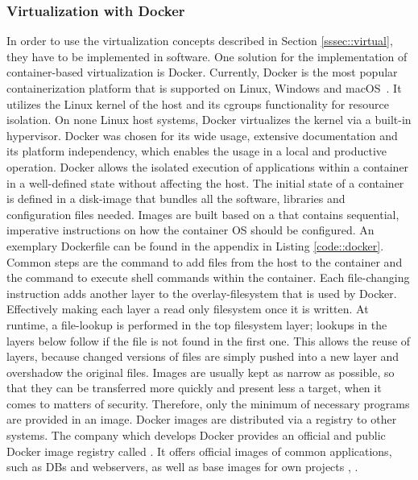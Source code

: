         \subsubsection{Virtualization with Docker}\label{sssec::docker}
        In order to use the virtualization concepts described in Section \ref{sssec::virtual}, they have to be implemented in software. One solution for the implementation of container-based virtualization is Docker. Currently, Docker is the most popular containerization platform that is supported on Linux, Windows and macOS~\cite{docker_share}. It utilizes the Linux kernel of the host and its cgroups functionality for resource isolation. On none Linux host systems, Docker virtualizes the kernel via a built-in hypervisor. Docker was chosen for its wide usage, extensive documentation and its platform independency, which enables the usage in a local and productive operation.\newline
        Docker allows the isolated execution of applications within a container in a well-defined state without affecting the host. The initial state of a container is defined in a disk-image that bundles all the software, libraries and configuration files needed. Images are built based on a  that contains sequential, imperative instructions on how the container \ac{OS} should be configured. An exemplary Dockerfile can be found in the appendix in Listing \ref{code::docker}. Common steps are the  command to add files from the host to the container and the  command to execute shell commands within the container. Each file-changing instruction adds another layer to the overlay-filesystem that is used by Docker. Effectively making each layer a read only filesystem once it is written. At runtime, a file-lookup is performed in the top filesystem layer; lookups in the layers below follow if the file is not found in the first one. This allows the reuse of layers, because changed versions of files are simply pushed into a new layer and overshadow the original files. Images are usually kept as narrow as possible, so that they can be transferred more quickly and  present less a target, when it comes to matters of security. Therefore, only the minimum of necessary programs are provided in an image. Docker images are distributed via a registry to other systems. The company which develops Docker provides an official and public Docker image registry called . It offers official images of common applications, such as \acl{DB}s and webservers, as well as base images for own projects \cite{docker2020}, \cite{dockerdocs}.\newpage
